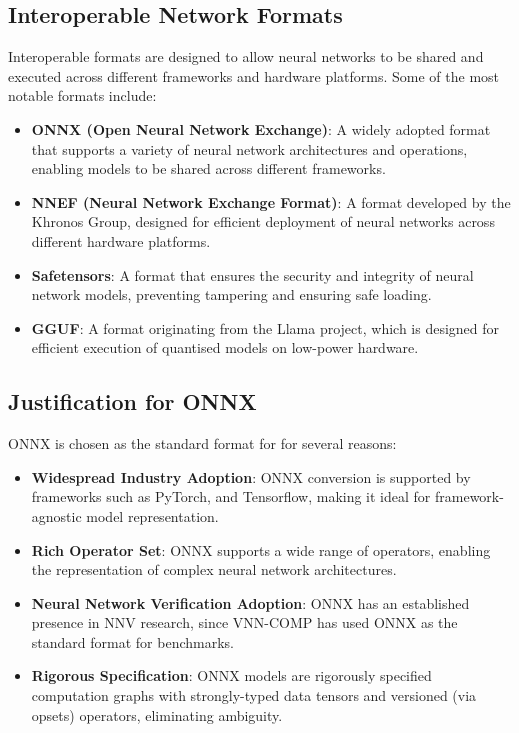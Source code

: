 \subsection{Interoperable Network Formats}
Interoperable formats are designed to allow neural networks to be shared and executed across different frameworks and hardware platforms. Some of the most notable formats include:
\begin{itemize}
	\item \textbf{ONNX (Open Neural Network Exchange)}: A widely adopted format that supports a variety of neural network architectures and operations, enabling models to be shared across different frameworks.
	\item \textbf{NNEF (Neural Network Exchange Format)}: A format developed by the Khronos Group, designed for efficient deployment of neural networks across different hardware platforms.
	\item \textbf{Safetensors}: A format that ensures the security and integrity of neural network models, preventing tampering and ensuring safe loading.
	\item \textbf{GGUF}: A format originating from the Llama project, which is designed for efficient execution of quantised models on low-power hardware. 
\end{itemize}

\subsection{Justification for ONNX}
ONNX is chosen as the standard format for \vnnlib{} for several reasons:
\begin{itemize}
	\item \textbf{Widespread Industry Adoption}: ONNX conversion is supported by frameworks such as PyTorch, and Tensorflow, making it ideal for framework-agnostic model representation.
	\item \textbf{Rich Operator Set}: ONNX supports a wide range of operators, enabling the representation of complex neural network architectures.
	\item \textbf{Neural Network Verification Adoption}: ONNX has an established presence in NNV research, since VNN-COMP has used ONNX as the standard format for benchmarks.
	\item \textbf{Rigorous Specification}: ONNX models are rigorously specified computation graphs with strongly-typed data tensors and versioned (via opsets) operators, eliminating ambiguity.
\end{itemize}

